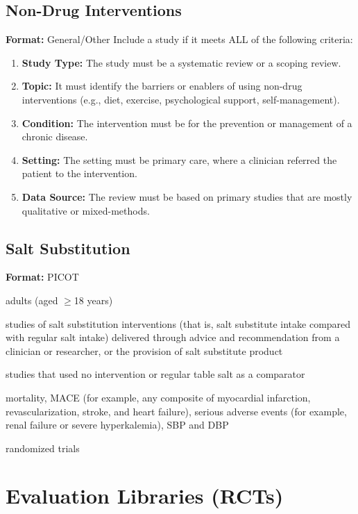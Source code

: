 \documentclass[11pt,a4paper]{article}
\begin{document}
\subsection{Non-Drug Interventions}
\textbf{Format:} General/Other
\newline
Include a study if it meets ALL of the following criteria:
\begin{enumerate}[noitemsep]
    \item \textbf{Study Type:} The study must be a systematic review or a scoping review.
    \item \textbf{Topic:} It must identify the barriers or enablers of using non-drug interventions (e.g., diet, exercise, psychological support, self-management).
    \item \textbf{Condition:} The intervention must be for the prevention or management of a chronic disease.
    \item \textbf{Setting:} The setting must be primary care, where a clinician referred the patient to the intervention.
    \item \textbf{Data Source:} The review must be based on primary studies that are mostly qualitative or mixed-methods.
\end{enumerate}

\subsection{Salt Substitution}
\textbf{Format:} PICOT
\begin{description}[style=nextline]
    \item[Population:] adults (aged $\geq$18 years)
    \item[Intervention:] studies of salt substitution interventions (that is, salt substitute intake compared with regular salt intake) delivered through advice and recommendation from a clinician or researcher, or the provision of salt substitute product
    \item[Comparator:] studies that used no intervention or regular table salt as a comparator
    \item[Outcome:] mortality, MACE (for example, any composite of myocardial infarction, revascularization, stroke, and heart failure), serious adverse events (for example, renal failure or severe hyperkalemia), SBP and DBP
    \item[Type of study:] randomized trials
\end{description}

\section{Evaluation Libraries (RCTs)}
\end{document}

